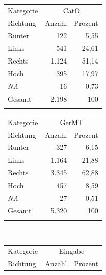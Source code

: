\begin{table}
    \begin{minipage}{0.5\textwidth}\centering
             \begin{tabular}{lrr} 
             \lsptoprule
             Kategorie & \multicolumn{2}{c}{{CatO}} \\ 
             \cmidrule(lr){2-3}
            {Richtung} & \multicolumn{1}{c}{Anzahl} & \multicolumn{1}{c}{Prozent}  \\ 
            \midrule
            Runter & 122 & 5,55 \\ 
            Links & 541 & 24,61 \\ 
            Rechts & 1.124 & 51,14 \\ 
            Hoch & 395 & 17,97 \\ 
            \emph{NA} & 16 & 0,73 \\ 
            \midrule
            {Gesamt} & 2.198 & 100 \\ 
            \lspbottomrule
         \end{tabular}    
    \end{minipage}\begin{minipage}{0.5\textwidth}\centering
             \begin{tabular}{lrr} 
             \lsptoprule
             Kategorie & \multicolumn{2}{c}{{GerMT}} \\ 
             \cmidrule(lr){2-3}
            {Richtung} & \multicolumn{1}{c}{Anzahl} & \multicolumn{1}{c}{Prozent}  \\ 
            \midrule
            Runter & 327 & 6,15 \\ 
            Links & 1.164 & 21,88 \\ 
            Rechts & 3.345 & 62,88 \\ 
            Hoch & 457 & 8,59 \\ 
            \emph{NA} & 27 & 0,51 \\ 
            \midrule
            {Gesamt} & 5.320 & 100 \\ 
            \lspbottomrule
         \end{tabular}    
    \end{minipage}\medskip\\\begin{minipage}{0.5\textwidth}\centering
             \begin{tabular}{lrr}
             \lsptoprule
             Kategorie & \multicolumn{2}{c}{{Eingabe}} \\ 
             \cmidrule(lr){2-3}
            {Richtung} & \multicolumn{1}{c}{Anzahl} & \multicolumn{1}{c}{Prozent}  \\ 

\end{tabular}
\end{minipage}
\end{table}
